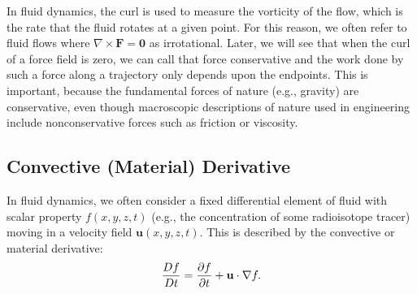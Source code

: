 In fluid dynamics, the curl is used to measure the vorticity of the flow, which is the rate that the fluid rotates at a given point. For this reason, we often refer to fluid flows where $\nabla \times \mathbf{F} = \mathbf{0}$ as irrotational. Later, we will see that when the curl of a force field is zero, we can call that force conservative and the work done by such a force along a trajectory only depends upon the endpoints. This is important, because the fundamental forces of nature (e.g., gravity) are conservative, even though macroscopic descriptions of nature used in engineering include nonconservative forces such as friction or viscosity.

\subsection{Convective (Material) Derivative}

In fluid dynamics, we often consider a fixed differential element of fluid with scalar property $f(x,y,z,t)$ (e.g., the concentration of some radioisotope tracer) moving in a velocity field $\mathbf{u}(x,y,z,t)$. This is described by the convective or material derivative:
\begin{align}
  \frac{Df}{Dt} = \frac{ \partial {f} }{ \partial {t} } + \mathbf{u} \cdot \nabla f .
\end{align}

